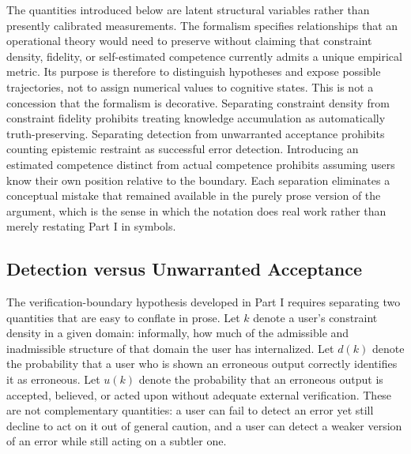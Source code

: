 \documentclass[11pt]{article}
\begin{document}
The quantities introduced below are latent structural variables rather than presently calibrated measurements. The formalism specifies relationships that an operational theory would need to preserve without claiming that constraint density, fidelity, or self-estimated competence currently admits a unique empirical metric. Its purpose is therefore to distinguish hypotheses and expose possible trajectories, not to assign numerical values to cognitive states. This is not a concession that the formalism is decorative. Separating constraint density from constraint fidelity prohibits treating knowledge accumulation as automatically truth-preserving. Separating detection from unwarranted acceptance prohibits counting epistemic restraint as successful error detection. Introducing an estimated competence distinct from actual competence prohibits assuming users know their own position relative to the boundary. Each separation eliminates a conceptual mistake that remained available in the purely prose version of the argument, which is the sense in which the notation does real work rather than merely restating Part I in symbols.

\subsection{Detection versus Unwarranted Acceptance}

The verification-boundary hypothesis developed in Part I requires separating two quantities that are easy to conflate in prose. Let $k$ denote a user's constraint density in a given domain: informally, how much of the admissible and inadmissible structure of that domain the user has internalized. Let $d(k)$ denote the probability that a user who is shown an erroneous output correctly identifies it as erroneous. Let $u(k)$ denote the probability that an erroneous output is accepted, believed, or acted upon without adequate external verification. These are not complementary quantities: a user can fail to detect an error yet still decline to act on it out of general caution, and a user can detect a weaker version of an error while still acting on a subtler one.
\end{document}

